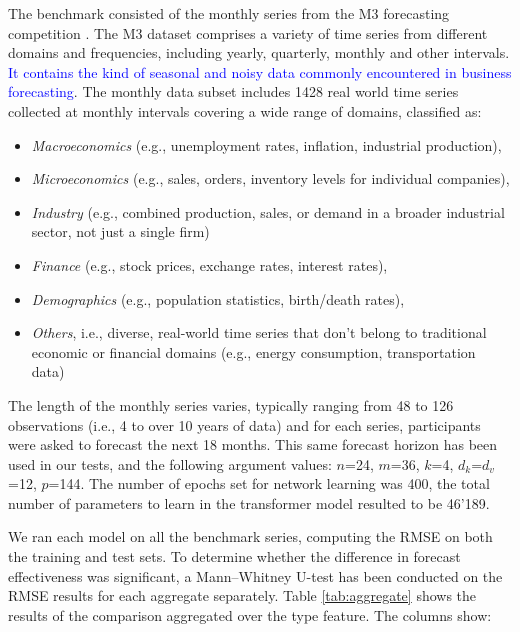 \documentclass[algorithms,article,submit,pdftex,moreauthors]{Definitions/mdpi}
\begin{document}
The benchmark consisted of the monthly series from the M3 forecasting competition \cite{MH00}. The M3 dataset comprises a variety of time series from different domains and frequencies, including yearly, quarterly, monthly and other intervals. \textcolor{blue}{It contains the kind of seasonal and noisy data commonly encountered in business forecasting}. The monthly data subset includes 1428 real world time series collected at monthly intervals covering a wide range of domains, classified as:

\begin{itemize}
	\item {\it Macroeconomics} (e.g., unemployment rates, inflation, industrial production),
	\item {\it Microeconomics} (e.g., sales, orders, inventory levels for individual companies),
	\item {\it Industry} (e.g., combined production, sales, or demand in a broader industrial sector, not just a single firm)
	\item {\it Finance} (e.g., stock prices, exchange rates, interest rates),
	\item {\it Demographics} (e.g., population statistics, birth/death rates),
	\item {\it Others}, i.e., diverse, real-world time series that don’t belong to traditional economic or financial domains (e.g., energy consumption, transportation data)
\end{itemize}

The length of the monthly series varies, typically ranging from 48 to 126 observations (i.e., 4 to over 10 years of data) and for each series, participants were asked to forecast the next 18 months. This same forecast horizon has been used in our tests, and the following argument values: $n$=24, $m$=36, $k$=4, $d_k$=$d_v$=12, $p$=144. The number of epochs set for network learning was 400, the total number of parameters to learn in the transformer model resulted to be 46'189.

We ran each model on all the benchmark series, computing the RMSE on both the training and test sets. To determine whether the difference in forecast effectiveness was significant, a Mann–Whitney U-test has been conducted on the RMSE results for each aggregate separately. Table \ref{tab:aggregate} shows the results of the comparison aggregated over the type feature. The columns show:
\end{document}
